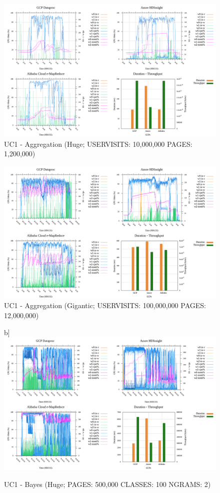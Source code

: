 \documentclass[review]{elsarticle}
\begin{document}
\begin{figure}[b]
	\includegraphics[width=\textwidth]{uc1-aggreg-h-cmidt}
	\caption{UC1 - Aggregation (Huge; USERVISITS: 10,000,000 PAGES: 1,200,000)}
	\label{fig:uc1-aggreg-h-cmidt}
	\centering
\end{figure}

\begin{figure}[b]
	\includegraphics[width=\textwidth]{uc1-aggreg-g-cmidt}
	\caption{UC1 - Aggregation (Gigantic; USERVISITS: 100,000,000 PAGES: 12,000,000)}
	\label{fig:uc1-aggreg-g-cmidt}
	\centering
\end{figure}

\begin{figure}b]
	\includegraphics[width=\textwidth]{uc1-bayes-h-cmidt}
	\caption{UC1 - Bayes (Huge; PAGES: 500,000 CLASSES: 100 NGRAMS: 2)}
	\label{fig:uc1-bayes-h-cmidt}
	\centering
\end{figure}
\end{document}
